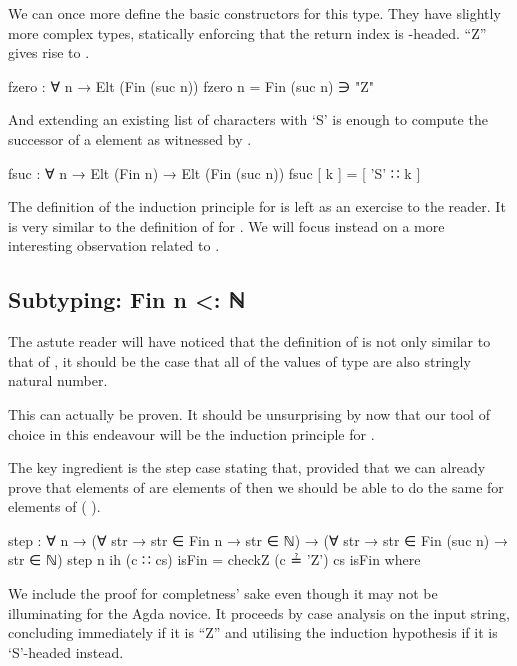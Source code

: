 \documentclass[twocolumn]{article}
\begin{document}
We can once more define the basic constructors for this type. They
have slightly more complex types, statically enforcing that the return
index is -headed. ``Z'' gives rise to .

\begin{code}
fzero : ∀ {n} → Elt (Fin (suc n))
fzero {n} = Fin (suc n) ∋ "Z"
\end{code}

And extending an existing list of characters with `S' is enough to
compute the successor of a   element as witnessed by
.

\begin{code}
fsuc : ∀ {n} → Elt (Fin n) → Elt (Fin (suc n))
fsuc [ k ] = [ 'S' ∷ k ]
\end{code}

The definition of the induction principle for  is left as
an exercise to the reader. It is very similar to the definition of
 for . We will focus instead on a more interesting
observation related to .

\subsection{Subtyping: Fin n <: ℕ}

The astute reader will have noticed that the definition of 
is not only similar to that of , it should be the case that
all of the values of type   are also stringly natural
number.

This can actually be proven. It should be unsurprising by now that
our tool of choice in this endeavour will be the induction principle
for .

The key ingredient is the step case stating that, provided that
we can already prove that elements of   are elements
of  then we should be able to do the same for elements of
 ( ).

\begin{code}
step : ∀ n → (∀ str → str ∈ Fin n → str ∈ ℕ) →
             (∀ str → str ∈ Fin (suc n) → str ∈ ℕ)
step n ih (c ∷ cs) isFin =
  checkZ (c ≟ 'Z') cs {{isFin}} where
\end{code}

We include the proof for completness' sake even though it may not
be illuminating for the Agda novice. It proceeds by case analysis
on the input string, concluding immediately if it is ``Z'' and
utilising the induction hypothesis if it is `S'-headed instead.
\end{document}
